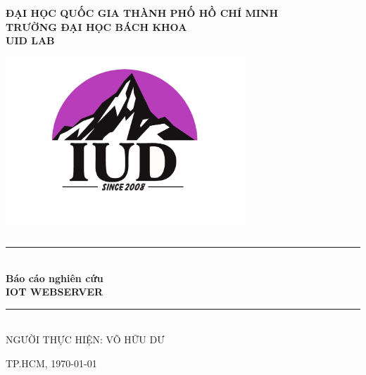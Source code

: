 \begin{titlepage}   
    \begin{center}
        \vspace*{-2cm} 
        \large
        \textbf{ĐẠI HỌC QUỐC GIA THÀNH PHỐ HỒ CHÍ MINH \\
        TRƯỜNG ĐẠI HỌC BÁCH KHOA\\
        UID LAB\\}
        \vspace{0.5cm}
        \includegraphics[width=90mm, height=70mm]{pictures/IUD_Logo.jpg} \\
        \rule{\linewidth}{0.5mm}\\
        \vspace{1cm}
        \LARGE
        \textbf{Báo cáo nghiên cứu}\\
        \vspace*{0.5cm}
        \Huge
        \textbf{IOT WEBSERVER}\\
        \vspace{0.5cm}
        \rule{\linewidth}{0.5mm}\\
        \vspace{0.8cm}
        \vspace{1cm}
        \large
        NGƯỜI THỰC HIỆN: VÕ HỮU DƯ\\[0.5cm]
    \end{center}
        
    \vfill
    \large
    \begin{center}
        TP.HCM, \today
    \end{center}
\end{titlepage}